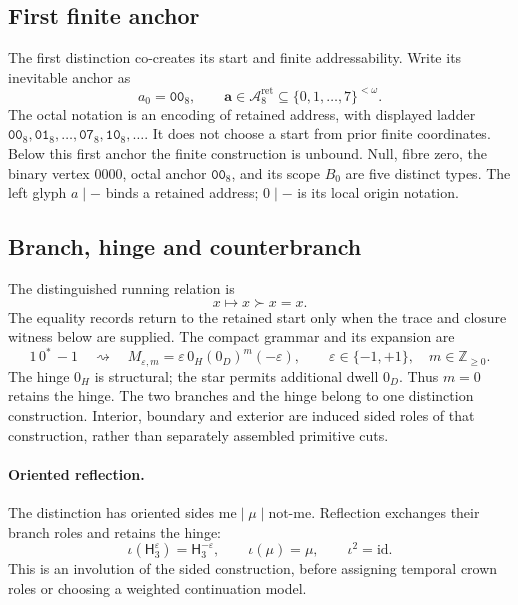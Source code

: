 \subsection{First finite anchor}
\label{subsec:afc-fractal-address}
The first distinction co-creates its start and finite addressability. Write
its inevitable anchor as
\begin{equation}
a_0=\mathtt{00}_8,\qquad
\mathbf a\in\mathcal A^{\mathrm{ret}}_8
\subseteq\{0,1,\ldots,7\}^{<\omega}.
\label{eq:first-anchor}
\end{equation}
The octal notation is an encoding of retained address, with displayed ladder
\(\mathtt{00}_8,\mathtt{01}_8,\ldots,\mathtt{07}_8,\mathtt{10}_8,\ldots\).
It does not choose a start from prior finite coordinates. Below this first
anchor the finite construction is unbound. Null, fibre zero, the binary
vertex \(0000\), octal anchor \(\mathtt{00}_8\), and its scope \(B_0\)
are five distinct types. The left glyph \(a\mid-\) binds a retained address;
\(0\mid-\) is its local origin notation.

\subsection{Branch, hinge and counterbranch}
\label{sec:cut-running-fractal-tesseract}
\label{subsec:null-symmetry}
\label{subsec:cut-running}
The distinguished running relation is
\label{subsec:local-cut-running-form}
\begin{equation}
x\longmapsto x\succ x=x.
\label{eq:cut-running-form}
\end{equation}
The equality records return to the retained start only when the trace and
closure witness below are supplied. The compact grammar and its expansion are
\label{subsec:branch-hinge-branch}
\begin{equation}
1\,0^*\,-1
\quad\rightsquigarrow\quad
M_{\varepsilon,m}=\varepsilon\,0_H(0_D)^m(-\varepsilon),
\qquad \varepsilon\in\{-1,+1\},\quad m\in\mathbb Z_{\ge0}.
\label{eq:hinge-grammar}
\end{equation}
The hinge \(0_H\) is structural; the star permits additional dwell \(0_D\).
Thus \(m=0\) retains the hinge. The two branches and the hinge belong to one
distinction construction. Interior, boundary and exterior are induced sided
roles of that construction, rather than separately assembled primitive cuts.

\paragraph{Oriented reflection.}
The distinction has oriented sides \(\mathrm{me}\mid\mu\mid\text{not-me}\).
Reflection exchanges their branch roles and retains the hinge:
\begin{equation}
\iota(\mathsf H_3^{\varepsilon})=\mathsf H_3^{-\varepsilon},\qquad
\iota(\mu)=\mu,\qquad\iota^2=\mathrm{id}.
\label{eq:hinge-reflection-involution}
\end{equation}
This is an involution of the sided construction, before assigning temporal
crown roles or choosing a weighted continuation model.

